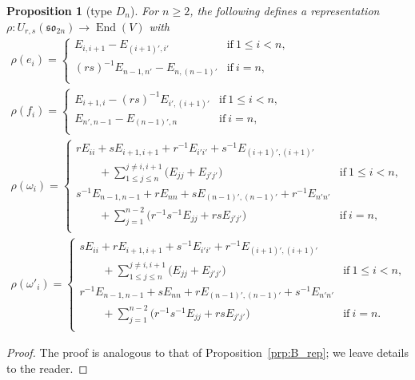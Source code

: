 \documentclass[pdftex]{sigma}
\numberwithin{equation}{section}
\newtheorem{Proposition}[Theorem]{Proposition}
 { \theoremstyle{definition}
\newtheorem{Definition}[Theorem]{Definition}
\newtheorem{Note}[Theorem]{Note}
\newtheorem{Example}[Theorem]{Example}
\newtheorem{Remark}[Theorem]{Remark} }
\DeclareMathOperator{\End}{End}
\newcommand{\sso}{\mathfrak{so}}
\begin{document}
\begin{Proposition}[type $D_n$]\label{prp:D_rep}
For $n \ge 2$, the following defines a representation $\rho\colon  U_{r,s}(\sso_{2n}) \to \End(V)$ with
\begin{gather*}
 \rho(e_{i}) =
 \begin{cases}
 E_{i,i+1} - E_{(i + 1)',i'} & \mathrm{if}\ 1\leq i<n, \\
 (rs)^{-1}E_{n - 1, n'} - E_{n,(n-1)'} & \mathrm{if}\ i=n, \\
 \end{cases} \\
 \rho(f_{i}) =
 \begin{cases}
 E_{i + 1,i} - (rs)^{-1}E_{i', (i + 1)'} & \mathrm{if}\ 1\leq i<n, \\
 E_{n', n-1} - E_{(n-1)',n} & \mathrm{if}\ i=n ,\\
 \end{cases} \\
 \rho(\omega_{i}) =
 \begin{cases}
 \displaystyle rE_{ii} + sE_{i + 1,i + 1} + r^{-1}E_{i'i'} + s^{-1}E_{(i + 1)', (i+1)'} \\
 \displaystyle\qquad{}+\sum_{1\leq j\leq n}^{j \neq i,i + 1} \bigl(E_{jj} + E_{j'j'}\bigr)
 & \mathrm{if}\ 1\leq i<n ,\\
 \displaystyle s^{-1}E_{n-1,n-1} + rE_{nn} + sE_{(n-1)',(n-1)'} + r^{-1}E_{n'n'} \\
 \displaystyle\qquad{}+ \sum_{j = 1}^{n-2}\bigl(r^{-1}s^{-1}E_{jj} + rsE_{j'j'}\bigr)
 & \mathrm{if}\ i = n ,\\
 \end{cases} \\
 \rho(\omega'_{i}) =
 \begin{cases}
 \displaystyle sE_{ii} + rE_{i + 1,i + 1} + s^{-1}E_{i'i'} + r^{-1}E_{(i + 1)',(i + 1)'} \\
 \displaystyle\qquad{}+\sum_{1\leq j\leq n}^{j \neq i,i + 1} \bigl(E_{jj} + E_{j'j'}\bigr)
 & \mathrm{if}\ 1\leq i<n ,\\
 \displaystyle r^{-1}E_{n-1,n-1} + sE_{nn} + rE_{(n-1)',(n-1)'} + s^{-1}E_{n'n'} \\
 \displaystyle\qquad{}+ \sum_{j = 1}^{n-2}\bigl(r^{-1}s^{-1}E_{jj} + rsE_{j'j'}\bigr)
 & \mathrm{if}\ i = n. \\
\end{cases}	 	
\end{gather*}
\end{Proposition}


\begin{proof}
The proof is analogous to that of Proposition~\ref{prp:B_rep}; we leave details to the reader.
\end{proof}
\end{document}
